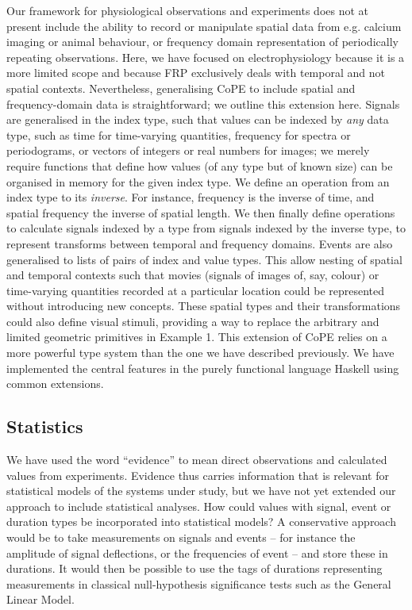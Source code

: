 Our framework for physiological observations and experiments does not
at present include the ability to record or manipulate spatial data
from e.g. calcium imaging or animal behaviour, or frequency domain
representation of periodically repeating observations. Here, we have
focused on electrophysiology because it is a more limited scope and
because FRP exclusively deals with temporal and not spatial
contexts. Nevertheless, generalising CoPE to include spatial and
frequency-domain data is straightforward; we outline this extension
here. Signals are generalised in the index type, such that values can
be indexed by \emph{any} data type, such as time for time-varying
quantities, frequency for spectra or periodograms, or vectors of
integers or real numbers for images; we merely require functions that
define how values (of any type but of known size) can be organised in
memory for the given index type. We define an operation from an index
type to its \emph{inverse}. For instance, frequency is the inverse of
time, and spatial frequency the inverse of spatial length. We then
finally define operations to calculate signals indexed by a type from
signals indexed by the inverse type, to represent transforms between
temporal and frequency domains. Events are also generalised to lists
of pairs of index and value types. This allow nesting of spatial and
temporal contexts such that movies (signals of images of, say, colour)
or time-varying quantities recorded at a particular location
\citep[for instance spot calcium measurements as points of signals of
concentration;][]{DiGregorio1999} could be represented without
introducing new concepts. These spatial types and their
transformations could also define visual stimuli, providing a way to
replace the arbitrary and limited geometric primitives in Example
1. This extension of CoPE relies on a more powerful type system than
the one we have described previously. We have implemented the central
features in the purely functional language Haskell using common
extensions.

\subsection*{Statistics}

We have used the word ``evidence'' to mean direct observations and
calculated values from experiments. Evidence thus carries information
that is relevant for statistical models of the systems under study,
but we have not yet extended our approach to include statistical
analyses. How could values with signal, event or duration types be
incorporated into statistical models? A conservative approach would be to
take measurements on signals and events -- for instance the amplitude
of signal deflections, or the frequencies of event -- and store these in
durations. It would then be possible to use the tags of durations
representing measurements in classical null-hypothesis significance
tests such as the General Linear Model. 

